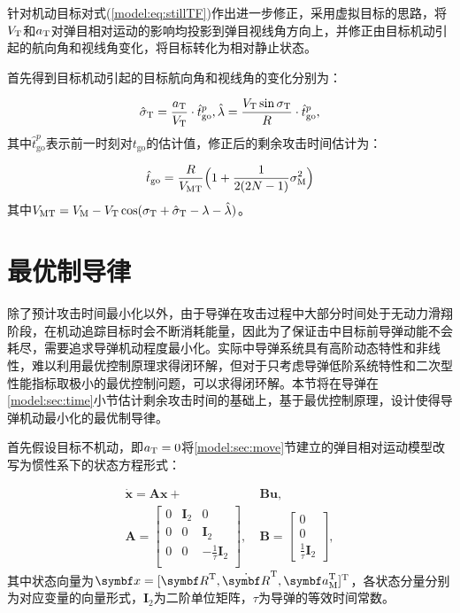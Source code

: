 针对机动目标对式(\ref{model:eq:stillTF})作出进一步修正，采用虚拟目标的思路，将$V_{\text T}$和$a_{\text T}$对弹目相对运动的影响均投影到弹目视线角方向上，并修正由目标机动引起的航向角和视线角变化，将目标转化为相对静止状态。

首先得到目标机动引起的目标航向角和视线角的变化分别为：

\begin{equation}
\label{model:eq:diffsigma}
	\hat \sigma_{\text T} = \frac{a_{\text T}}{V_{\text T}}\cdot \hat t_{\text{go}}^p,\quad \hat \lambda=\frac{V_{\text T}\sin{\sigma_{\text T}}}{R}\cdot \hat t_{\text{go}}^p,
\end{equation}
其中$\hat t_{\text{go}}^p$表示前一时刻对$t_{\text{go}}$的估计值，修正后的剩余攻击时间估计为：

\begin{equation}
\label{model:eq:modifiedTF}
	\hat t_{\text {go}} = \frac{R}{V_{\text{MT}}}\Big(1+\frac{1}{2(2N-1)}\sigma_{\text M}^2 \Big)
\end{equation}
其中$V_{\text{MT}}=V_{\text M}-V_{\text T}\cos(\sigma_{\text T}+\hat \sigma_{\text T}-\lambda-\hat \lambda)$。


\section{最优制导律}
\label{model:sec:energy}

除了预计攻击时间最小化以外，由于导弹在攻击过程中大部分时间处于无动力滑翔阶段，在机动追踪目标时会不断消耗能量，因此为了保证击中目标前导弹动能不会耗尽，需要追求导弹机动程度最小化。实际中导弹系统具有高阶动态特性和非线性，难以利用最优控制原理求得闭环解，但对于只考虑导弹低阶系统特性和二次型性能指标取极小的最优控制问题，可以求得闭环解。本节将在导弹在\ref{model:sec:time}小节估计剩余攻击时间的基础上，基于最优控制原理，设计使得导弹机动最小化的最优制导律。

首先假设目标不机动，即$a_{\text T}=0$将\ref{model:sec:move}节建立的弹目相对运动模型改写为惯性系下的状态方程形式：

\begin{align}
\label{model:eq:state}
	\dot{\bm{x}} = \bm{Ax}+&\bm{Bu},\\
	\bm{A} = \begin{bmatrix}
		0 & {\bm I}_2 & 0\\
		0 & 0 & {\bm I}_2\\
		0 & 0 & -\frac{1}{\tau}{\bm I}_2\\
	\end{bmatrix},\ 
	&\bm{B} = \begin{bmatrix}
		0\\0\\\frac{1}{\tau}{\bm I}_2
	\end{bmatrix},
\end{align}
其中状态向量为${\bm x}=[{\bm R}^{\mathrm T},{\dot{\bm R}}^{\mathrm T},{\bm a}_{\text M}^{\mathrm T}]^{\mathrm T}$，各状态分量分别为对应变量的向量形式，${\bm I}_2$为二阶单位矩阵，$\tau$为导弹的等效时间常数。

